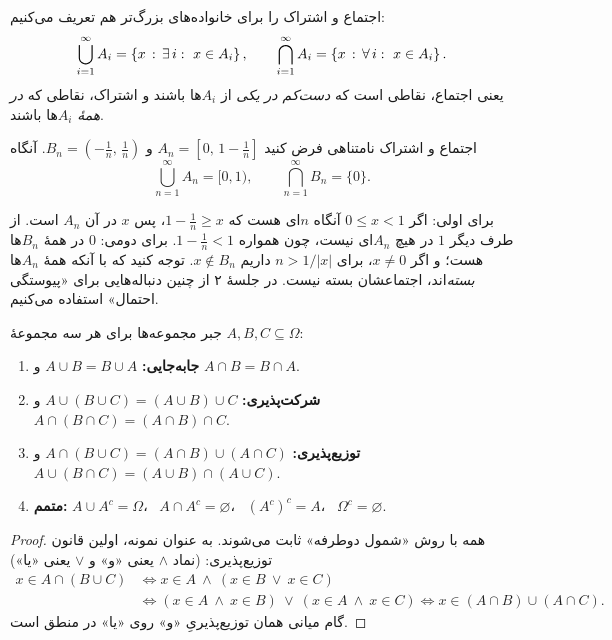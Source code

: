 اجتماع و اشتراک را برای خانواده‌های بزرگ‌تر هم تعریف می‌کنیم:
\[
\bigcup_{i=1}^{\infty} A_i = \left\{x \,:\, \exists\, i:\ x\in A_i\right\},\qquad
\bigcap_{i=1}^{\infty} A_i = \left\{x \,:\, \forall\, i:\ x\in A_i\right\}.
\]
یعنی اجتماع، نقاطی است که \emph{دست‌کم در یکی} از $A_i$ها باشند و اشتراک، نقاطی که \emph{در همهٔ} $A_i$ها باشند.

\begin{example}{اجتماع و اشتراک نامتناهی}
فرض کنید $A_n=\left[0,\,1-\tfrac1n\right]$ و $B_n=\left(-\tfrac1n,\,\tfrac1n\right)$. آنگاه
\[ \bigcup_{n=1}^\infty A_n = [0,1), \qquad \bigcap_{n=1}^\infty B_n=\{0\}. \]
\begin{solution}
برای اولی: اگر $0\le x<1$ آنگاه $n$ای هست که $1-\tfrac1n\ge x$، پس $x$ در آن $A_n$ است. از طرف دیگر $1$ در هیچ $A_n$ای نیست، چون همواره $1-\tfrac1n<1$. برای دومی: $0$ در همهٔ $B_n$ها هست؛ و اگر $x\ne0$، برای $n>1/|x|$ داریم $x\notin B_n$.
توجه کنید که با آنکه همهٔ $A_n$ها \emph{بسته}‌اند، اجتماعشان بسته نیست. در جلسهٔ ۲ از چنین دنباله‌هایی برای «پیوستگی احتمال» استفاده می‌کنیم.
\end{solution}
\end{example}

\begin{theorem}[label=thm:set-algebra]{جبر مجموعه‌ها}
برای هر سه مجموعهٔ $A,B,C\subseteq\Omega$:
\begin{enumerate}
  \item \textbf{جابه‌جایی:} $A\cup B=B\cup A$ \quad و \quad $A\cap B=B\cap A$.
  \item \textbf{شرکت‌پذیری:} $A\cup(B\cup C)=(A\cup B)\cup C$ \quad و \quad $A\cap(B\cap C)=(A\cap B)\cap C$.
  \item \textbf{توزیع‌پذیری:} $A\cap(B\cup C)=(A\cap B)\cup(A\cap C)$ \quad و \quad $A\cup(B\cap C)=(A\cup B)\cap(A\cup C)$.
  \item \textbf{متمم:} $A\cup A^c=\Omega$، \ $A\cap A^c=\varnothing$، \ $(A^c)^c=A$، \ $\Omega^c=\varnothing$.
\end{enumerate}
\end{theorem}

\begin{proof}
همه با روش «شمول دوطرفه» ثابت می‌شوند. به عنوان نمونه، اولین قانون توزیع‌پذیری:
(نماد $\wedge$ یعنی «و» و $\vee$ یعنی «یا»)
\begin{align*}
x\in A\cap(B\cup C) &\iff x\in A \ \wedge\ (x\in B \ \vee\ x\in C)\\
&\iff (x\in A \ \wedge\ x\in B)\ \vee\ (x\in A \ \wedge\ x\in C)
\iff x\in (A\cap B)\cup(A\cap C).
\end{align*}
گام میانی همان توزیع‌پذیریِ «و» روی «یا» در منطق است.
\end{proof}


